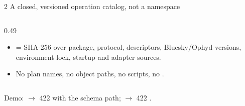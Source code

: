\begin{frame}{2 \quad A closed, versioned operation catalog, not a namespace}
\begin{columns}[T]
\begin{column}{0.49\textwidth}
\begin{block}{\vtwo{}}
\begin{itemize}
                          before persistence.
                    \item {} = SHA-256 over package, protocol, descriptors, Bluesky/Ophyd
                          versions, environment lock, startup and adapter sources. 
                    \item No plan names, no object paths, no scripts, no .
                \end{itemize}
            \end{block}
        \end{column}
    \end{columns}
    \vspace{0.1cm}
    {\footnotesize\color{qsgray} Demo:  $\rightarrow$ 422 with the schema path;\quad
     $\rightarrow$ 422 .\par}
\end{frame}

